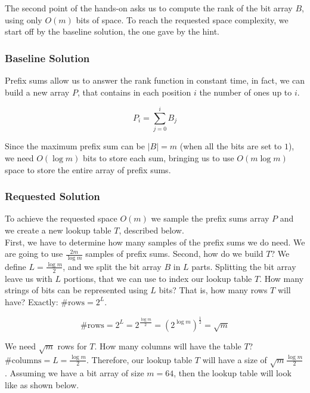 \documentclass{article}
\begin{document}
The second point of the hands-on asks us to compute the rank of the bit array $B$, using only $O(m)$ bits of space. To reach the requested space complexity,
we start off by the baseline solution, the one gave by the hint.\\

\subsubsection{Baseline Solution}

\noindent Prefix sums allow us to answer the rank function in constant time, in fact, we can build a new array $P$, that contains in each position $i$ the number of ones
up to $i$.

\begin{equation}
    P_i = \sum_{j = 0}^{i} B_j
\end{equation}

\noindent Since the maximum prefix sum can be $|B| = m$ (when all the bits are set to $1$), we need $O(\log m)$ bits to store each sum, bringing us to use
$O(m \log m)$ space to store the entire array of prefix sums.\\

\subsubsection{Requested Solution}

\noindent To achieve the requested space $O(m)$ we sample the prefix sums array $P$ and we create a new lookup table $T$, described below.\\

\noindent First, we have to determine how many samples
of the prefix sums we do need. We are going to use $\frac{2m}{\log m}$ samples of prefix sums. Second, how do we build $T$? We define $L = \frac{\log m}{2}$, and we split the bit array $B$
in $L$ parts. Splitting the bit array leave us with $L$ portions, that we can use to index our lookup table $T$. 
How many strings of bits can be represented using $L$ bits? That is, how many rows $T$ will have? Exactly: $\#\textrm{rows} = 2^L$.

\begin{equation}
    \textrm{\#rows} = 2^L = 2^{\frac{\log m}{2}} = (2^{\log m})^{\frac{1}{2}} = \sqrt m
\end{equation}

\noindent We need $\sqrt m$ rows for $T$. How many columns will have the table $T$? $\# \textrm{columns} = L = \frac{\log m}{2}$. Therefore, our lookup table $T$ will have a size of $\sqrt m \frac{\log m}{2}$. Assuming we have a bit array of size 
$m = 64$, then the lookup table will look like as shown below.
\end{document}
